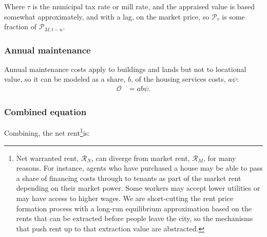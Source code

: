 Where $\tau$ is the municipal tax rate or \gls{mill rate}, and the \gls{appraised value} is based somewhat approximately, and with a lag, on the \gls{market price}, so $\mathcal{P}_{\tau}$ is some fraction of $\mathcal{P}_{M, t-n}$.

\subsubsection{Annual maintenance}
Annual maintenance costs apply to buildings and lands but not to locational value, so it can be modeled as a share, $b$, of the housing services costs, $a \psi$: 
\begin{align}
\mathcal{O} &= a b \psi.
\end{align}

\subsubsection{Combined equation}
Combining, the \gls{net rent}\footnote{Net warranted rent, $\mathcal{R}_N$, can diverge from market rent, $\mathcal{R}_M$, for many reasons. For instance, agents who have purchased a house may be able to pass a share of financing costs through to tenants as part of the market rent depending on their market power. Some workers may accept lower utilities or may have access to higher wages. %
We are short-cutting the rent price formation process with a long-run equilibrium approximation based on the rents that can be extracted before people leave the city, so the mechanisms that push rent up to that extraction value are abstracted. %
% 
}is:

